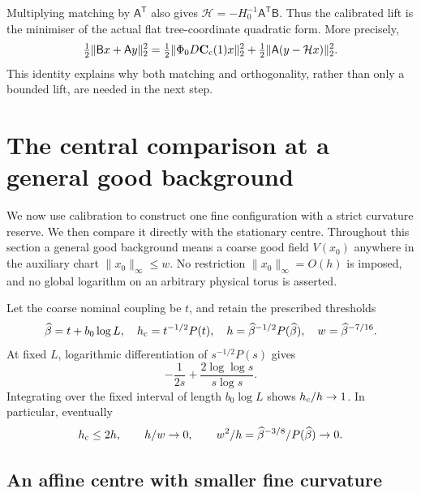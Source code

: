 \documentclass[11pt,reqno]{amsart}
\numberwithin{equation}{section}
\theoremstyle{definition}
\theoremstyle{remark}
\begin{document}
Multiplying matching by \(\mathsf A^{\mathsf T}\) also gives
\(\mathcal H=-H_0^{-1}\mathsf A^{\mathsf T}\mathsf B\).
Thus the calibrated lift is the minimiser of the actual flat
tree-coordinate quadratic form. More precisely,
\[
 \tfrac12\|\mathsf Bx+\mathsf Ay\|_2^2
 =\tfrac12\|\Phi_0D\mathbf C_{\rm c}(1)x\|_2^2
          +\tfrac12\|\mathsf A(y-\mathcal Hx)\|_2^2.
\]
This identity explains why both matching and orthogonality,
rather than only a bounded lift, are needed in the next step.

\section{The central comparison at a general good background}
\label{sec:general-central-comparison}

We now use calibration to construct one fine configuration with
a strict curvature reserve. We then compare it directly with the
stationary centre. Throughout this section a general good background
means a coarse good field \(V(x_0)\) anywhere in the auxiliary
chart \(\|x_0\|_\infty\le w\). No restriction
\(\|x_0\|_\infty=O(h)\) is imposed, and no global logarithm on
an arbitrary physical torus is asserted.

Let the coarse nominal coupling be \(t\), and retain the prescribed
thresholds
\begin{equation}
 \widehat\beta=t+b_0\log L,\quad
 h_{\rm c}=t^{-1/2}P(t),\quad
 h=\widehat\beta^{-1/2}P(\widehat\beta),\quad
 w=\widehat\beta^{-7/16}.
 \label{eq:general-central-thresholds}
\end{equation}
At fixed \(L\), logarithmic differentiation of
\(s^{-1/2}P(s)\) gives
\[
 -\frac1{2s}+\frac{2\log\log s}{s\log s}.
\]
Integrating over the fixed interval of length \(b_0\log L\)
shows \(h_{\rm c}/h\to1\). In particular, eventually
\begin{equation}
 h_{\rm c}\le2h,\qquad h/w\to0,\qquad
       w^2/h=\widehat\beta^{-3/8}/P(\widehat\beta)\to0.
 \label{eq:general-central-scale-reserves}
\end{equation}

\subsection{An affine centre with smaller fine curvature}
\end{document}
